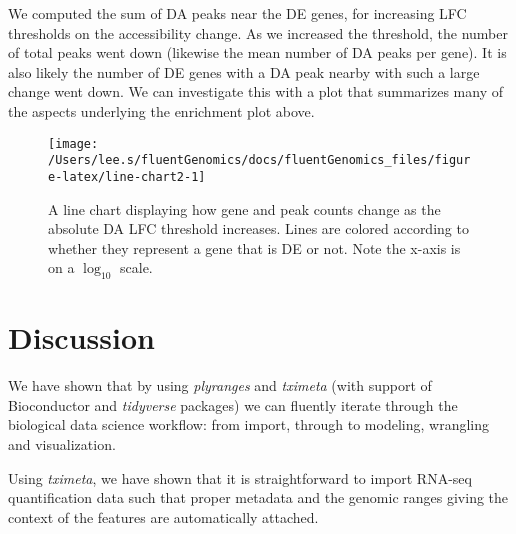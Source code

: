 \documentclass[
]{article}
\newenvironment{Shaded}{}{}
\newcommand{\DataTypeTok}[1]{\textcolor[rgb]{0.56,0.13,0.00}{#1}}
\newcommand{\DecValTok}[1]{\textcolor[rgb]{0.25,0.63,0.44}{#1}}
\newcommand{\KeywordTok}[1]{\textcolor[rgb]{0.00,0.44,0.13}{\textbf{#1}}}
\newcommand{\NormalTok}[1]{#1}
\newcommand{\OperatorTok}[1]{\textcolor[rgb]{0.40,0.40,0.40}{#1}}
\newcommand{\StringTok}[1]{\textcolor[rgb]{0.25,0.44,0.63}{#1}}
\begin{document}
We computed the sum of DA peaks near the DE genes, for increasing LFC
thresholds on the accessibility change. As we increased the threshold, the
number of total peaks went down (likewise the mean number of DA peaks per
gene). It is also likely the number of DE genes with a DA peak nearby with such
a large change went down. We can investigate this with a plot that summarizes
many of the aspects underlying the enrichment plot above.

\begin{Shaded}
\end{Shaded}

\begin{figure}

{\centering \texttt{[image: /Users/lee.s/fluentGenomics/docs/fluentGenomics\_files/figure-latex/line-chart2-1]} 

}

\caption{A line chart displaying how gene and peak counts change as the
absolute DA LFC threshold increases. Lines are colored according to whether
they represent a gene that is DE or not. Note the x-axis is on a \(\log_10\)
scale.}\label{fig:line-chart2}
\end{figure}

\hypertarget{discussion}{%
\section{Discussion}\label{discussion}}

We have shown that by using \emph{plyranges} and \emph{tximeta} (with support of
Bioconductor and \emph{tidyverse} packages) we can fluently iterate through the
biological data science workflow: from import, through to modeling, wrangling
and visualization.

Using \emph{tximeta}, we have shown that it is straightforward to import RNA-seq
quantification data such that proper metadata and the genomic ranges giving the
context of the features are automatically attached.
\end{document}
